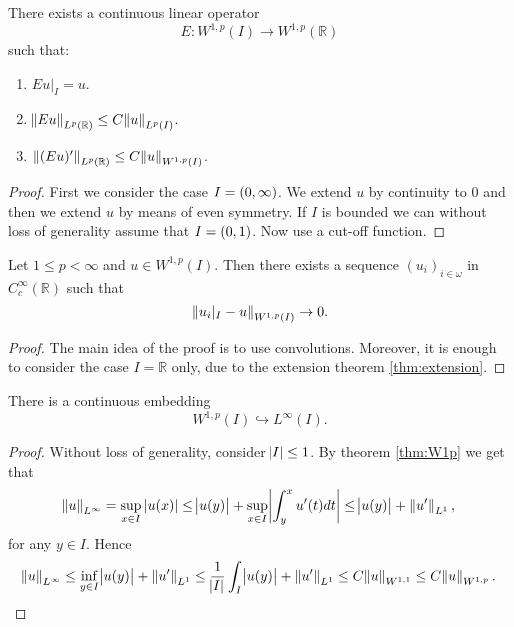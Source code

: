 \begin{theorem}
	\label{thm:extension}
	There exists a continuous linear operator 
	\begin{equation*}
		E : W^{1,p}(I) \to W^{1,p}(\mathbb{R})
	\end{equation*}
	\noindent such that:
	\begin{enumerate}[label = \textup{(}\roman*\textup{)},wide = 0pt]
		\item $Eu\vert_I = u$.
		\item $\norm{Eu}_{L^p(\mathbb{R})} \leq C \norm{u}_{L^p(I)}$.
		\item $\norm[0]{(Eu)'}_{L^p(\mathbb{R})} \leq C\norm{u}_{W^{1,p}(I)}$.
	\end{enumerate}
\end{theorem}

\begin{proof}
	First we consider the case $I = \intoo{0,\infty}$. We extend $u$ by continuity to $0$ and then we extend $u$ by means of even symmetry. If $I$ is bounded we can without loss of generality assume that $I = \intoo{0,1}$. Now use a cut-off function.
\end{proof}

\begin{theorem}
	Let $1 \leq p < \infty$ and $u \in W^{1,p}(I)$. Then there exists a sequence $(u_i)_{i \in \omega}$ in $C^\infty_c(\mathbb{R})$ such that
	\begin{equation*}
		\norm[0]{u_i\vert_I - u}_{W^{1,p}(I)} \to 0.
	\end{equation*}
\end{theorem}

\begin{proof}
	The main idea of the proof is to use convolutions. Moreover, it is enough to consider the case $I = \mathbb{R}$ only, due to the extension theorem \ref{thm:extension}. 	
\end{proof}

\begin{theorem}
	\label{thm:Sobolev_embedding}
	There is a continuous embedding 
	\begin{equation*}
			W^{1,p}(I) \hookrightarrow L^\infty(I).
	\end{equation*}
\end{theorem}

\begin{proof}
	Without loss of generality, consider $\abs{I} \leq 1$. By theorem \ref{thm:W1p} we get that
	\begin{equation*}
		\norm{u}_{L^\infty} = \sup_{x \in I} \abs[0]{u(x)} \leq \abs{u(y)} + \sup_{x \in I} \abs[3]{\int_y^x u'(t) dt} \leq \abs{u(y)} + \norm[0]{u'}_{L^1}, 
	\end{equation*}
	\noindent for any $y \in I$. Hence
	\begin{equation*}
		\norm{u}_{L^\infty} \leq \inf_{y \in I} \abs{u(y)} + \norm[0]{u'}_{L^1} \leq \frac{1}{\abs{I}}\int_I \abs{u(y)} + \norm[0]{u'}_{L^1} \leq C \norm{u}_{W^{1,1}} \leq C \norm{u}_{W^{1,p}}.
	\end{equation*}
\end{proof}


